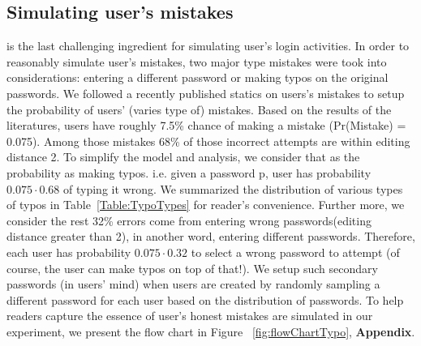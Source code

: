 \subsection{Simulating user's mistakes} is the last challenging ingredient for simulating user's login activities. In order to reasonably simulate user's mistakes, two major type mistakes were took into considerations: entering a different password or making typos on the original passwords. We followed a recently published statics on users's mistakes\cite{CCS:CWPCR17} to setup the probability of users' (varies type of) mistakes. Based on the results of the literatures, users have roughly 7.5\% chance of making a mistake (Pr(Mistake) = 0.075). Among those mistakes 68\% of those incorrect attempts are within editing distance 2. To simplify the model and analysis, we consider that as the probability as making typos. i.e. given a password p, user has probability $0.075\cdot 0.68$ of typing it wrong. We summarized the distribution of various types of typos in Table~\ref{Table:TypoTypes} for reader's convenience.  Further more, we consider the rest 32\% errors come from entering wrong passwords(editing distance greater than 2), in another word, entering different passwords. Therefore, each user has probability $0.075\cdot 0.32$ to select a wrong password to attempt (of course, the user can make typos on top of that!). We setup such secondary passwords (in users' mind) when users are created by randomly sampling a different password for each user based on the distribution of passwords. To help readers capture the essence of user's honest mistakes are simulated in our experiment, we present the flow chart in Figure ~\ref{fig:flowChartTypo}, \textbf{Appendix}.

